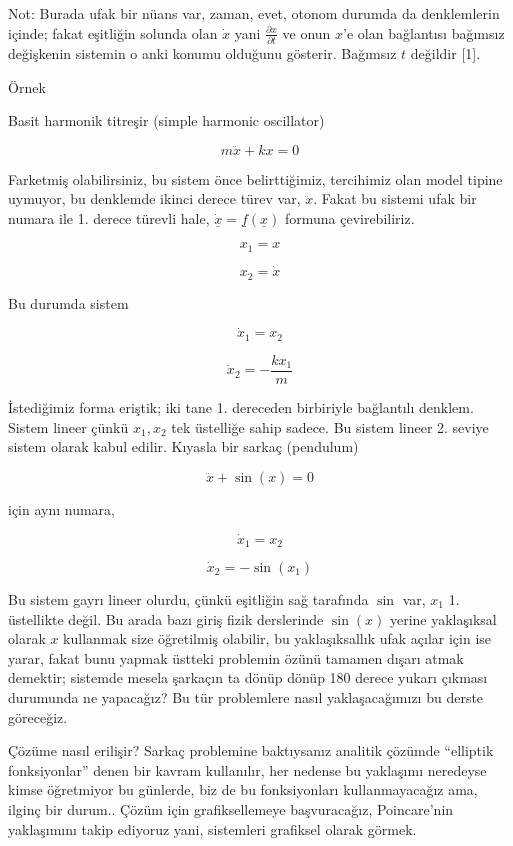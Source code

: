 \documentclass[12pt,fleqn]{article}\usepackage{../../common}
\begin{document}
Not: Burada ufak bir nüans var, zaman, evet, otonom durumda da denklemlerin
içinde; fakat eşitliğin solunda olan $\dot{x}$ yani $\frac{\partial x}{\partial
  t}$ ve onun $x$'e olan bağlantısı bağımsız değişkenin sistemin o anki konumu
olduğunu gösterir.  Bağımsız $t$ değildir [1].

Örnek

Basit harmonik titreşir (simple harmonic oscillator)

$$
m\ddot{x} + kx = 0
$$

Farketmiş olabilirsiniz, bu sistem önce belirttiğimiz, tercihimiz olan
model tipine uymuyor, bu denklemde ikinci derece türev var,
$\ddot{x}$. Fakat bu sistemi ufak bir numara ile 1. derece türevli hale,
$\dot{\underline{x}} = \underline{f}(\underline{x})$ formuna çevirebiliriz. 

$$ x_1 = x $$

$$
x_2 = \dot{x}
$$

Bu durumda sistem

$$
\dot{x}_1 = x_2
$$

$$
\dot{x}_2 = -\frac{kx_1}{m}
$$

İstediğimiz forma eriştik; iki tane 1. dereceden birbiriyle bağlantılı
denklem. Sistem lineer çünkü $x_1,x_2$ tek üstelliğe sahip sadece. Bu
sistem lineer 2. seviye sistem olarak kabul edilir. Kıyasla bir sarkaç
(pendulum) 

$$ \ddot{x} + \sin(x) = 0 $$

için aynı numara, 

$$
\dot{x}_1 = x_2
$$

$$
\dot{x}_2 = -\sin(x_1)
$$

Bu sistem gayrı lineer olurdu, çünkü eşitliğin sağ tarafında $\sin$ var, $x_1$
1. üstellikte değil. Bu arada bazı giriş fizik derslerinde $\sin(x)$ yerine
yaklaşıksal olarak $x$ kullanmak size öğretilmiş olabilir, bu yaklaşıksallık
ufak açılar için ise yarar, fakat bunu yapmak üstteki problemin özünü tamamen
dışarı atmak demektir; sistemde mesela şarkaçın ta dönüp dönüp 180 derece yukarı
çıkması durumunda ne yapacağız? Bu tür problemlere nasıl yaklaşacağımızı bu
derste göreceğiz.

Çözüme nasıl erilişir? Sarkaç problemine baktıysanız analitik çözümde
``elliptik fonksiyonlar'' denen bir kavram kullanılır, her nedense bu
yaklaşımı neredeyse kimse öğretmiyor bu günlerde, biz de bu fonksiyonları
kullanmayacağız ama, ilginç bir durum.. Çözüm için grafiksellemeye
başvuracağız, Poincare'nin yaklaşımını takip ediyoruz yani, sistemleri
grafiksel olarak görmek.
\end{document}
